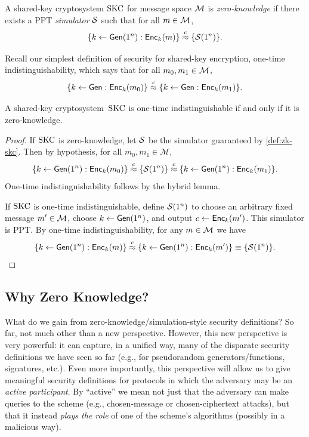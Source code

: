 \documentclass[11pt]{article}
\begin{document}
\begin{definition}
  \label{def:zk-skc}
  A shared-key cryptosystem $\text{SKC}$ for message space $\mathcal{M}$ is
  \emph{zero-knowledge} if there exists a PPT \emph{simulator}
  $\mathcal{S}$ such that for all $m \in \mathcal{M}$, \[ \{k \gets
    \mathsf{Gen}(1^{n}) : \mathsf{Enc}_{k}(m)\} \stackrel{c}{\approx} \{\mathcal{S}(1^{n})\}. \]
\end{definition}

Recall our simplest definition of security for shared-key encryption,
one-time indistinguishability, which says that for all $m_{0}, m_{1}
\in \mathcal{M}$, \[ \{k \gets \mathsf{Gen} : \mathsf{Enc}_{k}(m_{0})\} \stackrel{c}{\approx}
\{k \gets \mathsf{Gen} : \mathsf{Enc}_{k}(m_{1})\}. \]

\begin{theorem}
  \label{thm:zk-iff-indist}
  A shared-key cryptosystem~$\text{SKC}$ is one-time indistinguishable if and only if it is zero-knowledge.
\end{theorem}

\begin{proof}
  If $\text{SKC}$ is zero-knowledge, let $\mathcal{S}$ be the simulator guaranteed by \cref{def:zk-skc}.
  Then by hypothesis, for all $m_{0}, m_{1} \in \mathcal{M}$,
  \[ \{k \gets \mathsf{Gen}(1^{n}): \mathsf{Enc}_{k}(m_0)\} \stackrel{c}{\approx} \{\mathcal{S}(1^{n})\} \stackrel{c}{\approx} \{k \gets \mathsf{Gen}(1^{n}) : \mathsf{Enc}_{k}(m_1)\}.
  \] One-time indistinguishability follows by the hybrid lemma.

  If $\text{SKC}$ is one-time indistinguishable, define $\mathcal{S}(1^{n})$ to choose an arbitrary fixed message $m' \in \mathcal{M}$, choose $k \gets \mathsf{Gen}(1^{n})$, and output $c \gets \mathsf{Enc}_{k}(m')$.
  This simulator is PPT\@.
  By one-time indistinguishability, for any $m \in \mathcal{M}$ we have
  \[ \{k \gets \mathsf{Gen}(1^{n}): \mathsf{Enc}_{k}(m)\} \stackrel{c}{\approx} \{k \gets \mathsf{Gen}(1^{n}) : \mathsf{Enc}_{k}(m')\} \equiv \{\mathcal{S}(1^{n})\}.
  \]
\end{proof}

\subsection{Why Zero Knowledge?}
\label{sec:why-zero-knowledge}

What do we gain from zero-knowledge/simulation-style security
definitions?  So far, not much other than a new perspective.  However,
this new perspective is very powerful: it can capture, in a unified
way, many of the disparate security definitions we have seen so far
(e.g., for pseudorandom generators/functions, signatures, etc.).  Even
more importantly, this perspective will allow us to give meaningful
security definitions for protocols in which the adversary may be an
\emph{active participant}.  By ``active'' we mean not just that the
adversary can make queries to the scheme (e.g., chosen-message or
chosen-ciphertext attacks), but that it instead \emph{plays the role}
of one of the scheme's algorithms (possibly in a malicious way).
\end{document}
